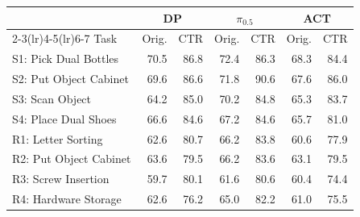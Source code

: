 \begin{tabular}{lrrrrrr}
\toprule
 & \multicolumn{2}{c}{DP} & \multicolumn{2}{c}{$\pi_{0.5}$} & \multicolumn{2}{c}{ACT} \\
\cmidrule(lr){2-3}\cmidrule(lr){4-5}\cmidrule(lr){6-7}
Task & Orig. & CTR & Orig. & CTR & Orig. & CTR \\
\midrule
S1: Pick Dual Bottles & 70.5 & 86.8 & 72.4 & 86.3 & 68.3 & 84.4 \\
S2: Put Object Cabinet & 69.6 & 86.6 & 71.8 & 90.6 & 67.6 & 86.0 \\
S3: Scan Object & 64.2 & 85.0 & 70.2 & 84.8 & 65.3 & 83.7 \\
S4: Place Dual Shoes & 66.6 & 84.6 & 67.2 & 84.6 & 65.7 & 81.0 \\
\midrule
R1: Letter Sorting & 62.6 & 80.7 & 66.2 & 83.8 & 60.6 & 77.9 \\
R2: Put Object Cabinet & 63.6 & 79.5 & 66.2 & 83.6 & 63.1 & 79.5 \\
R3: Screw Insertion & 59.7 & 80.1 & 61.6 & 80.6 & 60.4 & 74.4 \\
R4: Hardware Storage & 62.6 & 76.2 & 65.0 & 82.2 & 61.0 & 75.5 \\
\bottomrule
\end{tabular}
